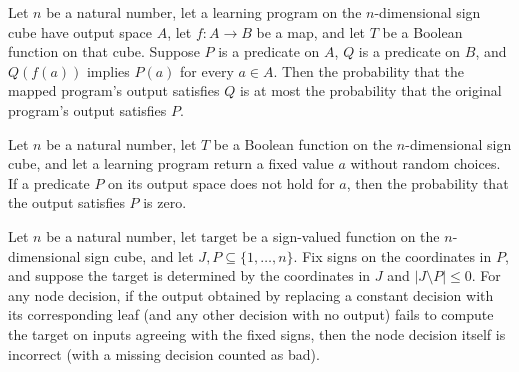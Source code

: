 \begin{theorem}
\label{FABL.eventProbability_map_output_le}
\leanok
{}
Let $n$ be a natural number, let a learning program on the $n$-dimensional sign cube
have output space $A$, let $f:A\to B$ be a map, and let $T$ be a Boolean function on
that cube. Suppose $P$ is a predicate on $A$, $Q$ is a predicate on $B$, and $Q(f(a))$
implies $P(a)$ for every $a\in A$. Then the probability that the mapped program's output
satisfies $Q$ is at most the probability that the original program's output satisfies
$P$.
\end{theorem}

\begin{theorem}
\label{FABL.eventProbability_pure_eq_zero_of_not}
\leanok
{}
Let $n$ be a natural number, let $T$ be a Boolean function on the $n$-dimensional sign
cube, and let a learning program return a fixed value $a$ without random choices. If a
predicate $P$ on its output space does not hold for $a$, then the probability that the
output satisfies $P$ is zero.
\end{theorem}

\begin{theorem}
\label{FABL.nodeLeafOutput_bad_implies_nodeBad}
\leanok
{}
Let $n$ be a natural number, let $\mathrm{target}$ be a sign-valued function on the
$n$-dimensional sign cube, and let $J,P\subseteq\{1,\ldots,n\}$. Fix signs on the
coordinates in $P$, and suppose the target is determined by the coordinates in $J$ and
$|J\setminus P|\le0$. For any node decision, if the output obtained by replacing a
constant decision with its corresponding leaf (and any other decision with no output)
fails to compute the target on inputs agreeing with the fixed signs, then the node
decision itself is incorrect (with a missing decision counted as bad).
\end{theorem}

